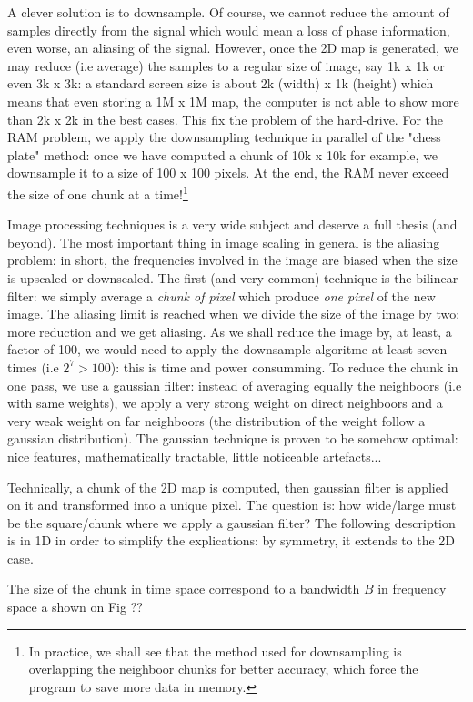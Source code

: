 \documentclass[12pt]{report}
\begin{document}
A clever solution is to downsample. Of course, we cannot reduce the amount of samples directly from the signal which would mean a loss of phase information, even worse, an aliasing of the signal. However, once the 2D map is generated, we may reduce (i.e average) the samples to a regular size of image, say 1k x 1k or even 3k x 3k: a standard screen size is about 2k (width) x 1k (height) which means that even storing a 1M x 1M map, the computer is not able to show more than 2k x 2k in the best cases. This fix the problem of the hard-drive. For the RAM problem, we apply the downsampling technique in parallel of the "chess plate" method: once we have computed a chunk of 10k x 10k for example, we downsample it to a size of 100 x 100 pixels. At the end, the RAM never exceed the size of one chunk at a time!\footnote{In practice, we shall see that the method used for downsampling is overlapping the neighboor chunks for better accuracy, which force the program to save more data in memory.}

Image processing techniques is a very wide subject and deserve a full thesis (and beyond). The most important thing in image scaling in general is the aliasing problem: in short, the frequencies involved in the image are biased when the size is upscaled or downscaled. The first (and very common) technique is the bilinear filter: we simply average a \textit{chunk of pixel} which produce \textit{one pixel} of the new image. The aliasing limit is reached when we divide the size of the image by two: more reduction and we get aliasing. As we shall reduce the image by, at least, a factor of 100, we would need to apply the downsample algoritme at least seven times (i.e $2^7 > 100$): this is time and power consumming. To reduce the chunk in one pass, we use a gaussian filter: instead of averaging equally the neighboors (i.e with same weights), we apply a very strong weight on direct neighboors and a very weak weight on far neighboors (the distribution of the weight follow a gaussian distribution). The gaussian technique is proven to be somehow optimal: nice features, mathematically tractable, little noticeable artefacts...

Technically, a chunk of the 2D map is computed, then gaussian filter is applied on it and transformed into a unique pixel. The question is: how wide/large must be the square/chunk where we apply a gaussian filter? The following description is in 1D in order to simplify the explications: by symmetry, it extends to the 2D case.

The size of the chunk in time space correspond to a bandwidth $B$ in frequency space a shown on Fig ??
\end{document}
